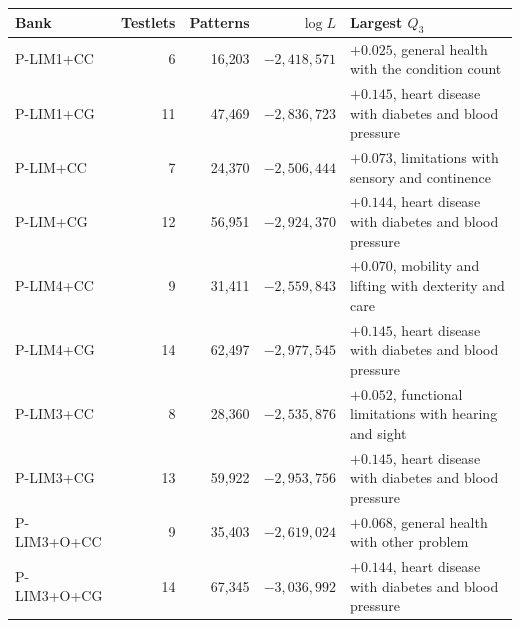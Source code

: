\begin{center}\footnotesize
\begin{tabular}{@{}lrrrl@{}}
\toprule
Bank & Testlets & Patterns & $\log L$ & Largest $Q_3$ \\
\midrule
P-LIM1+CC & 6 & 16{,}203 & $-2{,}418{,}571$ & $+0.025$, general health with the condition count \\
P-LIM1+CG & 11 & 47{,}469 & $-2{,}836{,}723$ & $+0.145$, heart disease with diabetes and blood pressure \\
P-LIM+CC & 7 & 24{,}370 & $-2{,}506{,}444$ & $+0.073$, limitations with sensory and continence \\
P-LIM+CG & 12 & 56{,}951 & $-2{,}924{,}370$ & $+0.144$, heart disease with diabetes and blood pressure \\
P-LIM4+CC & 9 & 31{,}411 & $-2{,}559{,}843$ & $+0.070$, mobility and lifting with dexterity and care \\
P-LIM4+CG & 14 & 62{,}497 & $-2{,}977{,}545$ & $+0.145$, heart disease with diabetes and blood pressure \\
P-LIM3+CC & 8 & 28{,}360 & $-2{,}535{,}876$ & $+0.052$, functional limitations with hearing and sight \\
P-LIM3+CG & 13 & 59{,}922 & $-2{,}953{,}756$ & $+0.145$, heart disease with diabetes and blood pressure \\
P-LIM3+O+CC & 9 & 35{,}403 & $-2{,}619{,}024$ & $+0.068$, general health with other problem \\
P-LIM3+O+CG & 14 & 67{,}345 & $-3{,}036{,}992$ & $+0.144$, heart disease with diabetes and blood pressure \\
\bottomrule
\end{tabular}
\end{center}
